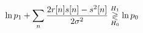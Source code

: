 \documentclass[preview]{standalone}
\begin{document}
\begin{align*}
\special{dvisvgm:raw <g id='unique000'>}\ln p_1+\sum_n\frac{2r[n]s[n]-s^2[n]}{2\sigma^2}\underset{H_0}{\overset{H_1}{\gtrless}}\ln p_0\special{dvisvgm:raw </g>}
\end{align*}
\end{document}
